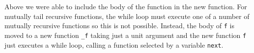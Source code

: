 Above we were able to include the body of the function in the new function. For mutually tail recursive functions, the while loop must execute one of a number of mutually recursive functions so this is not possible. Instead, the body of \verb|f| is moved to a new function \verb|_f| taking just a unit argument and the new function \verb|f| just executes a while loop, calling a function selected by a variable \verb|next|.


















